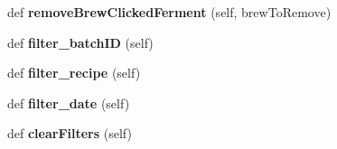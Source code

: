 \begin{DoxyCompactItemize}
\mbox{\label{classview_data_window_1_1_view_data_window_a970effe72c61e962875fb487ba73c720}} 
def {\bfseries remove\+Brew\+Clicked\+Ferment} (self, brew\+To\+Remove)
\item 
\mbox{\label{classview_data_window_1_1_view_data_window_ae2b7289eccac9833259902940ac28682}} 
def {\bfseries filter\+\_\+batch\+ID} (self)
\item 
\mbox{\label{classview_data_window_1_1_view_data_window_a604eea8e2ccc1108306887c94b6caab7}} 
def {\bfseries filter\+\_\+recipe} (self)
\item 
\mbox{\label{classview_data_window_1_1_view_data_window_a4e5a69321ebe4bf6100b91aca9f73849}} 
def {\bfseries filter\+\_\+date} (self)
\item 
\mbox{\label{classview_data_window_1_1_view_data_window_a012dc3ef09f782de73a05c1d14cc845b}} 
def {\bfseries clear\+Filters} (self)
\end{DoxyCompactItemize}
